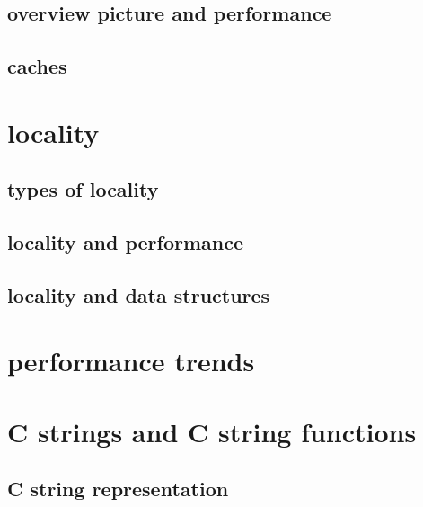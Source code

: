 \subsection{overview picture and performance}



\subsection{caches}



\section{locality}


\subsection{types of locality}



\subsection{locality and performance}



\subsection{locality and data structures}



\section{performance trends}

%



\section{C strings and C string functions}

\subsection{C string representation}

